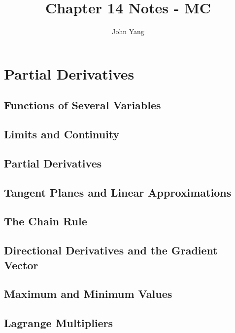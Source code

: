 \documentclass{article}
\title{Chapter 14 Notes - MC} %
\author{John Yang}
\begin{document}
    \maketitle
    \tableofcontents
    \section{Partial Derivatives} %
    \subsection{Functions of Several Variables} %
    \begin{outline}
        
    \end{outline}
    \subsection{Limits and Continuity}
    \begin{outline}
        
    \end{outline}
    \subsection{Partial Derivatives}
    \begin{outline}
        
    \end{outline}
    \subsection{Tangent Planes and Linear Approximations}
    \begin{outline}
        
    \end{outline}
    \subsection{The Chain Rule}
    \begin{outline}
        
    \end{outline}
    \subsection{Directional Derivatives and the Gradient Vector}
    \begin{outline}
        
    \end{outline}
    \subsection{Maximum and Minimum Values}
    \begin{outline}
        
    \end{outline}
    \subsection{Lagrange Multipliers}
    \begin{outline}
        
    \end{outline}
\end{document}
